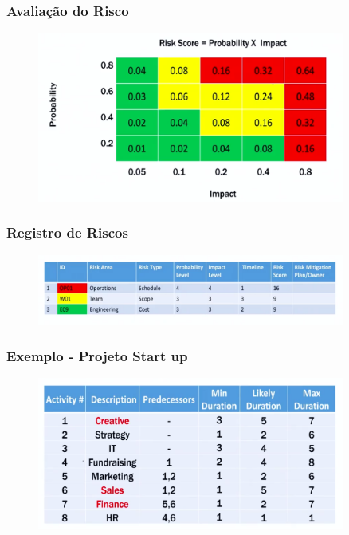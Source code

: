 \begin{frame}
 \frametitle{Avaliação do Risco}
  \begin{figure}
   \centering	
   \includegraphics[width = 0.9\textwidth]{figs/fig8.png}
  \end{figure}
\end{frame}

\begin{frame}
 \frametitle{Registro de Riscos}
  \begin{figure}
   \centering
   \includegraphics[width = 0.9\textwidth]{figs/fig9.png}
  \end{figure}
\end{frame}

\begin{frame}
 \frametitle{Exemplo - Projeto Start up}
  \begin{figure}
   \centering
   \includegraphics[width = 0.9\textwidth]{figs/fig10.png}
  \end{figure}
\end{frame}

